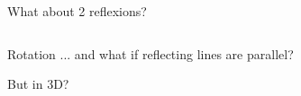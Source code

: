 \begin{frame}{What about 2 reflexions?}
\begin{columns}
\begin{center}
        \end{center}

    \end{columns}
    \hfill\href{https://enkimute.github.io/ganja.js/examples/coffeeshop.html\#yYimFv544&fullscreen}{}
\end{frame}


\begin{frame}{Rotation}
    \centering
    \huge
    ... and what if reflecting lines are parallel? \\
    \hfill\href{https://enkimute.github.io/ganja.js/examples/coffeeshop.html\#yYimFv544&fullscreen}{}
\end{frame}




\begin{frame}{But in 3D?}
    \centering
    \huge
\end{frame}


